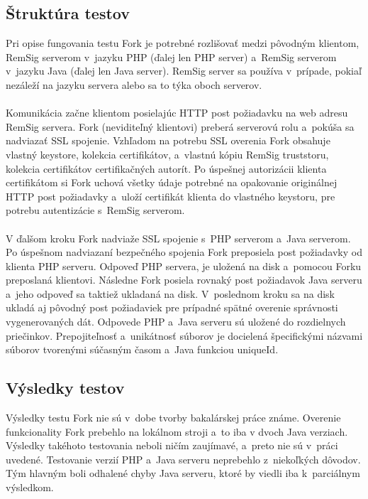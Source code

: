 \documentclass[
  digital, %
  table,   %
oneside,
  nolof,     %
  nolot,     %
]{fithesis3}
\begin{document}
\subsection{Štruktúra testov}
Pri opise fungovania testu Fork je potrebné rozlišovať medzi pôvodným klientom, RemSig serverom v~jazyku PHP (ďalej len PHP server) a~RemSig serverom v~jazyku Java (ďalej len Java server). RemSig server sa používa v~prípade, pokiaľ nezáleží na jazyku servera alebo sa to týka oboch serverov. \paragraph{} 
Komunikácia začne klientom posielajúc HTTP post požiadavku na web adresu RemSig servera. Fork (neviditeľný klientovi) preberá serverovú rolu a~pokúša sa nadviazať SSL spojenie. Vzhľadom na potrebu SSL overenia Fork  obsahuje vlastný keystore, kolekcia certifikátov, a~vlastnú kópiu RemSig truststoru, kolekcia certifikátov certifikačných autorít. Po úspešnej autorizácii klienta certifikátom si Fork uchová všetky údaje potrebné na opakovanie originálnej HTTP post požiadavky a~uloží certifikát klienta do vlastného keystoru, pre potrebu autentizácie s~RemSig serverom. \paragraph{}
V ďalšom kroku Fork nadviaže SSL spojenie s~PHP serverom a~Java serverom. Po úspešnom nadviazaní bezpečného spojenia Fork preposiela post požiadavky od klienta PHP serveru. Odpoveď PHP servera, je uložená na disk a~pomocou Forku preposlaná klientovi. Následne Fork posiela rovnaký post požiadavok Java serveru a~jeho odpoveď sa taktiež ukladaná na disk. V~poslednom kroku sa na disk ukladá aj pôvodný post požiadaviek pre prípadné spätné overenie správnosti vygenerovaných dát.
Odpovede PHP a~Java serveru sú uložené do rozdielnych priečinkov. Prepojiteľnosť a~unikátnosť  súborov je docielená špecifickými názvami súborov tvorenými súčasným časom a~Java funkciou  uniqueId. 
\subsection{Výsledky testov}
Výsledky testu Fork nie sú v~dobe tvorby bakalárskej práce známe. Overenie funkcionality Fork prebehlo na lokálnom stroji a~to iba v dvoch Java verziach. Výsledky takéhoto testovania neboli ničím zaujímavé, a~preto nie sú v~práci uvedené. Testovanie verzií PHP a~Java serveru neprebehlo z~niekoľkých dôvodov. Tým hlavným boli odhalené chyby Java serveru, ktoré by viedli iba k~parciálnym výsledkom.
\end{document}
